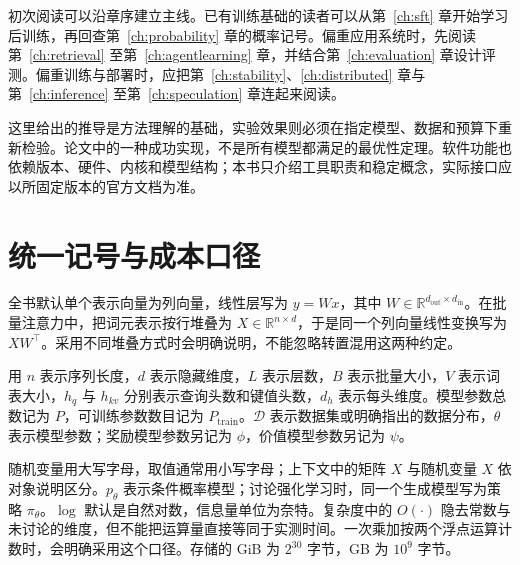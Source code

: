初次阅读可以沿章序建立主线。已有训练基础的读者可以从第~\ref{ch:sft} 章开始学习后训练，再回查第~\ref{ch:probability} 章的概率记号。偏重应用系统时，先阅读第~\ref{ch:retrieval} 至第~\ref{ch:agentlearning} 章，并结合第~\ref{ch:evaluation} 章设计评测。偏重训练与部署时，应把第~\ref{ch:stability}、\ref{ch:distributed} 章与第~\ref{ch:inference} 至第~\ref{ch:speculation} 章连起来阅读。

这里给出的推导是方法理解的基础，实验效果则必须在指定模型、数据和预算下重新检验。论文中的一种成功实现，不是所有模型都满足的最优性定理。软件功能也依赖版本、硬件、内核和模型结构；本书只介绍工具职责和稳定概念，实际接口应以所固定版本的官方文档为准。

\section{统一记号与成本口径}

全书默认单个表示向量为列向量，线性层写为 $y=Wx$，其中 $W\in\mathbb R^{d_{\mathrm{out}}\times d_{\mathrm{in}}}$。在批量注意力中，把词元表示按行堆叠为 $X\in\mathbb R^{n\times d}$，于是同一个列向量线性变换写为 $XW^\top$。采用不同堆叠方式时会明确说明，不能忽略转置混用这两种约定。

用 $n$ 表示序列长度，$d$ 表示隐藏维度，$L$ 表示层数，$B$ 表示批量大小，$V$ 表示词表大小，$h_q$ 与 $h_{kv}$ 分别表示查询头数和键值头数，$d_h$ 表示每头维度。模型参数总数记为 $P$，可训练参数数目记为 $P_{\mathrm{train}}$。$\mathcal D$ 表示数据集或明确指出的数据分布，$\theta$ 表示模型参数；奖励模型参数另记为 $\phi$，价值模型参数另记为 $\psi$。

随机变量用大写字母，取值通常用小写字母；上下文中的矩阵 $X$ 与随机变量 $X$ 依对象说明区分。$p_\theta$ 表示条件概率模型；讨论强化学习时，同一个生成模型写为策略 $\pi_\theta$。$\log$ 默认是自然对数，信息量单位为奈特。复杂度中的 $O(\cdot)$ 隐去常数与未讨论的维度，但不能把运算量直接等同于实测时间。一次乘加按两个浮点运算计数时，会明确采用这个口径。存储的 GiB 为 $2^{30}$ 字节，GB 为 $10^9$ 字节。

